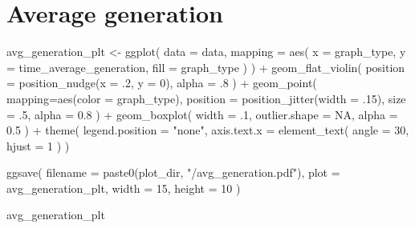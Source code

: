 \documentclass[
]{book}
\newenvironment{Shaded}{\begin{snugshade}}{\end{snugshade}}
\newcommand{\AttributeTok}[1]{\textcolor[rgb]{0.77,0.63,0.00}{#1}}
\newcommand{\ConstantTok}[1]{\textcolor[rgb]{0.00,0.00,0.00}{#1}}
\newcommand{\DecValTok}[1]{\textcolor[rgb]{0.00,0.00,0.81}{#1}}
\newcommand{\FloatTok}[1]{\textcolor[rgb]{0.00,0.00,0.81}{#1}}
\newcommand{\FunctionTok}[1]{\textcolor[rgb]{0.00,0.00,0.00}{#1}}
\newcommand{\NormalTok}[1]{#1}
\newcommand{\OtherTok}[1]{\textcolor[rgb]{0.56,0.35,0.01}{#1}}
\newcommand{\SpecialCharTok}[1]{\textcolor[rgb]{0.00,0.00,0.00}{#1}}
\newcommand{\StringTok}[1]{\textcolor[rgb]{0.31,0.60,0.02}{#1}}
\begin{document}
\hypertarget{average-generation}{%
\section{Average generation}\label{average-generation}}

\begin{Shaded}
\begin{Highlighting}[]
\NormalTok{avg\_generation\_plt }\OtherTok{\textless{}{-}} \FunctionTok{ggplot}\NormalTok{(}
    \AttributeTok{data =}\NormalTok{ data,}
    \AttributeTok{mapping =} \FunctionTok{aes}\NormalTok{(}
      \AttributeTok{x =}\NormalTok{ graph\_type,}
      \AttributeTok{y =}\NormalTok{ time\_average\_generation,}
      \AttributeTok{fill =}\NormalTok{ graph\_type}
\NormalTok{    )}
\NormalTok{  ) }\SpecialCharTok{+}
  \FunctionTok{geom\_flat\_violin}\NormalTok{(}
    \AttributeTok{position =} \FunctionTok{position\_nudge}\NormalTok{(}\AttributeTok{x =}\NormalTok{ .}\DecValTok{2}\NormalTok{, }\AttributeTok{y =} \DecValTok{0}\NormalTok{),}
    \AttributeTok{alpha =}\NormalTok{ .}\DecValTok{8}
\NormalTok{  ) }\SpecialCharTok{+}
  \FunctionTok{geom\_point}\NormalTok{(}
    \AttributeTok{mapping=}\FunctionTok{aes}\NormalTok{(}\AttributeTok{color =}\NormalTok{ graph\_type),}
    \AttributeTok{position =} \FunctionTok{position\_jitter}\NormalTok{(}\AttributeTok{width =}\NormalTok{ .}\DecValTok{15}\NormalTok{),}
    \AttributeTok{size =}\NormalTok{ .}\DecValTok{5}\NormalTok{,}
    \AttributeTok{alpha =} \FloatTok{0.8}
\NormalTok{  ) }\SpecialCharTok{+}
  \FunctionTok{geom\_boxplot}\NormalTok{(}
    \AttributeTok{width =}\NormalTok{ .}\DecValTok{1}\NormalTok{,}
    \AttributeTok{outlier.shape =} \ConstantTok{NA}\NormalTok{,}
    \AttributeTok{alpha =} \FloatTok{0.5}
\NormalTok{  ) }\SpecialCharTok{+}
  \FunctionTok{theme}\NormalTok{(}
    \AttributeTok{legend.position =} \StringTok{"none"}\NormalTok{,}
    \AttributeTok{axis.text.x =} \FunctionTok{element\_text}\NormalTok{(}
      \AttributeTok{angle =} \DecValTok{30}\NormalTok{,}
      \AttributeTok{hjust =} \DecValTok{1}
\NormalTok{    )}
\NormalTok{  )}

\FunctionTok{ggsave}\NormalTok{(}
  \AttributeTok{filename =} \FunctionTok{paste0}\NormalTok{(plot\_dir, }\StringTok{"/avg\_generation.pdf"}\NormalTok{),}
  \AttributeTok{plot =}\NormalTok{ avg\_generation\_plt,}
  \AttributeTok{width =} \DecValTok{15}\NormalTok{,}
  \AttributeTok{height =} \DecValTok{10}
\NormalTok{)}

\NormalTok{avg\_generation\_plt}
\end{Highlighting}
\end{Shaded}
\end{document}
